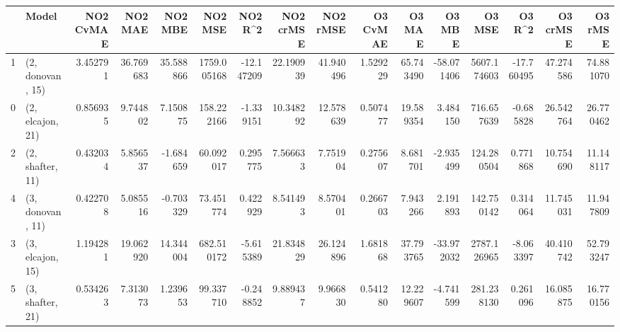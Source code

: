 \begin{tabular}{llrrrrrrrrrrrrrr}
\toprule
{} &             Model &  NO2 CvMAE &    NO2 MAE &    NO2 MBE &      NO2 MSE &    NO2 R\textasciicircum2 &  NO2 crMSE &   NO2 rMSE &  O3 CvMAE &     O3 MAE &     O3 MBE &       O3 MSE &     O3 R\textasciicircum2 &   O3 crMSE &    O3 rMSE \\
\midrule
1 &  (2, donovan, 15) &   3.452791 &  36.769683 &  35.588866 &  1759.005168 & -12.147209 &  22.190939 &  41.940496 &  1.529229 &  65.743490 & -58.071406 &  5607.174603 & -17.760495 &  47.274586 &  74.881070 \\
0 &  (2, elcajon, 21) &   0.856935 &   9.744802 &   7.150875 &   158.222166 &  -1.339151 &  10.348292 &  12.578639 &  0.507477 &  19.589354 &   3.484150 &   716.657639 &  -0.685828 &  26.542764 &  26.770462 \\
2 &  (2, shafter, 11) &   0.432034 &   5.856537 &  -1.684659 &    60.092017 &   0.295775 &   7.566633 &   7.751904 &  0.275607 &   8.681701 &  -2.935499 &   124.280504 &   0.771868 &  10.754690 &  11.148117 \\
4 &  (3, donovan, 11) &   0.422708 &   5.085516 &  -0.703329 &    73.451774 &   0.422929 &   8.541493 &   8.570401 &  0.266703 &   7.943266 &   2.191893 &   142.750142 &   0.314064 &  11.745031 &  11.947809 \\
3 &  (3, elcajon, 15) &   1.194281 &  19.062920 &  14.344004 &   682.510172 &  -5.615389 &  21.834829 &  26.124896 &  1.681868 &  37.793765 & -33.972032 &  2787.126965 &  -8.063397 &  40.410742 &  52.793247 \\
5 &  (3, shafter, 21) &   0.534263 &   7.313073 &   1.239653 &    99.337710 &  -0.248852 &   9.889437 &   9.966830 &  0.541280 &  12.229607 &  -4.741599 &   281.238130 &   0.261096 &  16.085875 &  16.770156 \\
\bottomrule
\end{tabular}
